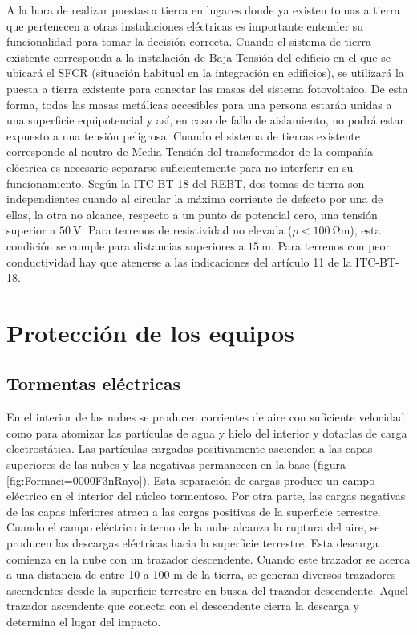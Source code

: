 A la hora de realizar puestas a tierra en lugares donde ya existen
tomas a tierra que pertenecen a otras instalaciones eléctricas es
importante entender su funcionalidad para tomar la decisión correcta.
Cuando el sistema de tierra existente corresponda a la instalación de
Baja Tensión del edificio en el que se ubicará el SFCR (situación
habitual en la integración en edificios), se utilizará la puesta a
tierra existente para conectar las masas del sistema fotovoltaico.  De
esta forma, todas las masas metálicas accesibles para una persona
estarán unidas a una superficie equipotencial y así, en caso de fallo
de aislamiento, no podrá estar expuesto a una tensión
peligrosa. Cuando el sistema de tierras existente corresponde al
neutro de Media Tensión del transformador de la compañía eléctrica es
necesario separarse suficientemente para no interferir en su
funcionamiento. Según la ITC-BT-18 del REBT, dos tomas de tierra son
independientes cuando al circular la máxima corriente de defecto por
una de ellas, la otra no alcance, respecto a un punto de potencial
cero, una tensión superior a $\SI{50}{\volt}$. Para terrenos de
resistividad no elevada ($\rho<\SI{100}{\ohm\meter}$), esta condición
se cumple para distancias superiores a $\SI{15}{\meter}$. Para
terrenos con peor conductividad hay que atenerse a las indicaciones
del artículo 11 de la ITC-BT-18.


\section{Protección de los equipos}


\subsection{Tormentas eléctricas}

En el interior de las nubes se producen corrientes de aire con suficiente
velocidad como para atomizar las partículas de agua y hielo del interior
y dotarlas de carga electrostática. Las partículas cargadas positivamente
ascienden a las capas superiores de las nubes y las negativas permanecen
en la base (figura \ref{fig:Formaci=0000F3nRayo}). Esta separación
de cargas produce un campo eléctrico en el interior del núcleo tormentoso.
Por otra parte, las cargas negativas de las capas inferiores atraen
a las cargas positivas de la superficie terrestre. Cuando el campo
eléctrico interno de la nube alcanza la ruptura del aire, se producen
las descargas eléctricas hacia la superficie terrestre. Esta descarga
comienza en la nube con un trazador descendente. Cuando este trazador
se acerca a una distancia de entre 10 a 100 m de la tierra, se generan
diversos trazadores ascendentes desde la superficie terrestre en busca
del trazador descendente. Aquel trazador ascendente que conecta con
el descendente cierra la descarga y determina el lugar del impacto.

